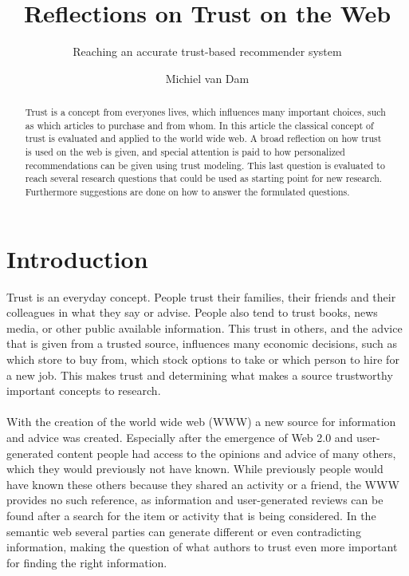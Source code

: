 \documentclass{llncs}
\begin{document}
\title{Reflections on Trust on the Web}
\subtitle{Reaching an accurate trust-based recommender system}
\author{Michiel van Dam}

\maketitle

\begin{abstract}
Trust is a concept from everyones lives, which influences many important choices, such as which articles to purchase and from whom. In this article the classical concept of trust is evaluated and applied to the world wide web. A broad reflection on how trust is used on the web is given, and special attention is paid to how personalized recommendations can be given using trust modeling. This last question is evaluated to reach several research questions that could be used as starting point for new research. Furthermore suggestions are done on how to answer the formulated questions. 
\end{abstract}


\section{Introduction}
Trust is an everyday concept. People trust their families, their friends and their colleagues in what they say or advise. People also tend to trust books, news media, or other public available information. This trust in others, and the advice that is given from a trusted source, influences many economic decisions, such as which store to buy from, which stock options to take or which person to hire for a new job. This makes trust and determining what makes a source trustworthy important concepts to research.\\
\\
With the creation of the world wide web (WWW) a new source for information and advice was created. Especially after the emergence of Web 2.0 and user-generated content people had access to the opinions and advice of many others, which they would previously not have known. While previously people would have known these others because they shared an activity or a friend, the WWW provides no such reference, as information and user-generated reviews can be found after a search for the item or activity that is being considered. In the semantic web several parties can generate different or even contradicting information, making the question of what authors to trust even more important for finding the right information.
\end{document}
